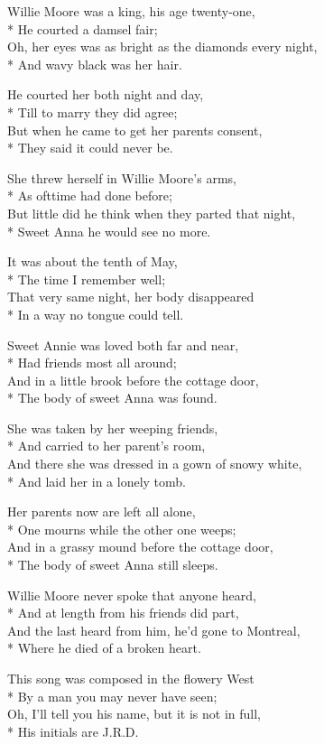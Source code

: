 

\versemark
Willie Moore was a king, his age twenty-one,\\*
He courted a damsel fair;\\
Oh, her eyes was as bright as the diamonds every night,\\*
And wavy black was her hair.

\versemark
He courted her both night and day,\\*
Till to marry they did agree;\\
But when he came to get her parents consent,\\*
They said it could never be.

\versemark
She threw herself in Willie Moore’s arms,\\*
As ofttime had done before;\\
But little did he think when they parted that night,\\*
Sweet Anna he would see no more.

\versemark
It was about the tenth of May,\\*
The time I remember well;\\
That very same night, her body disappeared\\*
In a way no tongue could tell.

\versemark
Sweet Annie was loved both far and near,\\*
Had friends most all around;\\
And in a little brook before the cottage door,\\*
The body of sweet Anna was found.

\versemark
She was taken by her weeping friends,\\*
And carried to her parent’s room,\\
And there she was dressed in a gown of snowy white,\\*
And laid her in a lonely tomb.

\versemark
Her parents now are left all alone,\\*
One mourns while the other one weeps;\\
And in a grassy mound before the cottage door,\\*
The body of sweet Anna still sleeps.

\versemark
Willie Moore never spoke that anyone heard,\\*
And at length from his friends did part,\\
And the last heard from him, he’d gone to Montreal,\\*
Where he died of a broken heart.

\versemark
This song was composed in the flowery West\\*
By a man you may never have seen;\\
Oh, I’ll tell you his name, but it is not in full,\\*
His initials are J.R.D.


